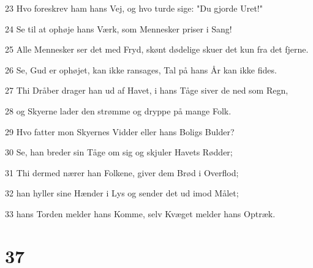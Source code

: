 \par 23 Hvo foreskrev ham hans Vej, og hvo turde sige: "Du gjorde Uret!"
\par 24 Se til at ophøje hans Værk, som Mennesker priser i Sang!
\par 25 Alle Mennesker ser det med Fryd, skønt dødelige skuer det kun fra det fjerne.
\par 26 Se, Gud er ophøjet, kan ikke ransages, Tal på hans År kan ikke fides.
\par 27 Thi Dråber drager han ud af Havet, i hans Tåge siver de ned som Regn,
\par 28 og Skyerne lader den strømme og dryppe på mange Folk.
\par 29 Hvo fatter mon Skyernes Vidder eller hans Boligs Bulder?
\par 30 Se, han breder sin Tåge om sig og skjuler Havets Rødder;
\par 31 Thi dermed nærer han Folkene, giver dem Brød i Overflod;
\par 32 han hyller sine Hænder i Lys og sender det ud imod Målet;
\par 33 hans Torden melder hans Komme, selv Kvæget melder hans Optræk.

\chapter{37}


